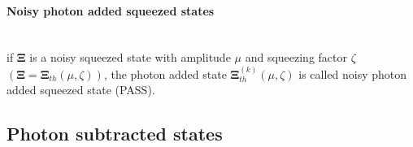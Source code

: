         \paragraph{Noisy photon added squeezed states}\mbox{}\\
        if $\pmb{\Xi}$ is a noisy squeezed state with amplitude $\mu$ and squeezing factor 
        $\zeta$ $(\pmb{\Xi}=\pmb{\Xi}_{th}(\mu,\zeta))$, the photon added state $\pmb{\Xi}_{th}^{(k)}
        (\mu,\zeta)$ is called noisy photon added squeezed state (PASS).

    \subsection{Photon subtracted states}